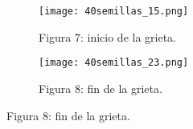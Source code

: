 \documentclass{article}
\begin{document}
\begin{figure}[H]
       \centering
       \begin{subfigure}[b]{0.45\linewidth}
           \texttt{[image: 40semillas\_15.png]}
           \caption{Figura 7: inicio de la grieta.}
           \label{fig:westminster_lateral}
        \end{subfigure}
        \begin{subfigure}[b]{0.45\linewidth}
           \texttt{[image: 40semillas\_23.png]}
           \caption{Figura 8: fin de la grieta.}
           \label{fig:westminster_aerea}
        \end{subfigure}
\end{figure}



\end{document}
